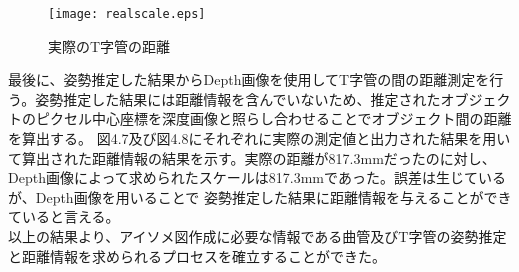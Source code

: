 \begin{figure}[htbt]
	\centering
	 \texttt{[image: realscale.eps]}
	 \caption{実際のT字管の距離}
	 \label{fig:f2}
\end{figure}

最後に、姿勢推定した結果からDepth画像を使用してT字管の間の距離測定を行う。姿勢推定した結果には距離情報を含んでいないため、推定されたオブジェクトのピクセル中心座標を深度画像と照らし合わせることでオブジェクト間の距離を算出する。
図4.7及び図4.8にそれぞれに実際の測定値と出力された結果を用いて算出された距離情報の結果を示す。実際の距離が817.3mmだったのに対し、Depth画像によって求められたスケールは817.3mmであった。誤差は生じているが、Depth画像を用いることで
姿勢推定した結果に距離情報を与えることができていると言える。\\
以上の結果より、アイソメ図作成に必要な情報である曲管及びT字管の姿勢推定と距離情報を求められるプロセスを確立することができた。